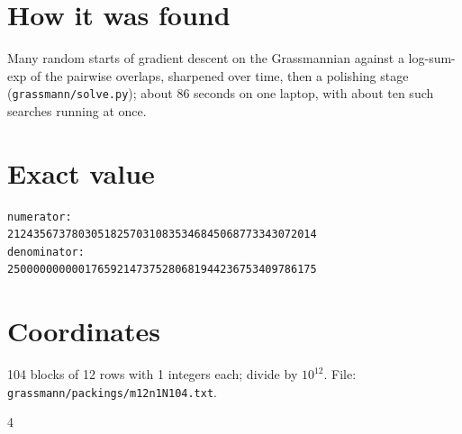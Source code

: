 \documentclass[11pt,a4paper]{article}
\begin{document}
\section{How it was found}
Many random starts of gradient descent on the Grassmannian against a log-sum-exp of the pairwise overlaps, sharpened over time, then a polishing stage (\texttt{grassmann/solve.py}); about 86 seconds on one laptop, with about ten such searches running at once.


\appendix
\section{Exact value}
{\small
\begin{verbatim}
numerator:
212435673780305182570310835346845068773343072014
denominator:
250000000000176592147375280681944236753409786175
\end{verbatim}}

\section{Coordinates}
104 blocks of 12 rows with 1 integers each; divide by $10^{12}$. File: \texttt{grassmann/packings/m12n1N104.txt}.
{\tiny
\begin{multicols}{4}
\end{multicols}}
\end{document}
